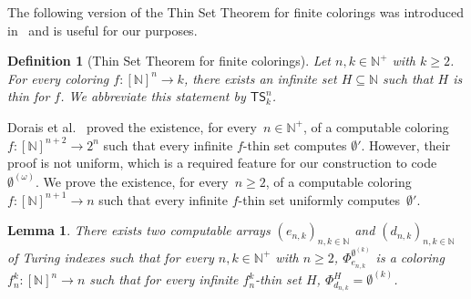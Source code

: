 \documentclass[10pt,a4paper]{article}
\newcommand{\TS}[0]{\mathsf{TS}}
\newcommand{\NN}[0]{\mathbb{N}}
\numberwithin{theorem}{section}
\newtheorem{lemma}[theorem]{Lemma}
\newtheorem{definition}[theorem]{Definition}
\begin{document}
The following version of the Thin Set Theorem for finite colorings was introduced in~\cite{dorais2016uniform} and is useful for our purposes.

\begin{definition}[Thin Set Theorem for finite colorings]\label{def:ts-finite}
Let $n, k\in \NN^+$ with $k\geq 2$. For every coloring $f : [\NN]^n \to k$, there exists an infinite set $H \subseteq \NN$ such that $H$ is thin for $f$. We abbreviate this statement by $\TS^n_{k}$.
\end{definition}

Dorais et al.~\cite[Proposition 5.5]{dorais2016uniform} proved the existence, for every~$n \in \NN^+$, of a computable coloring $f : [\NN]^{n+2} \to 2^n$ such that every infinite $f$-thin set computes $\emptyset'$. However, their proof is not uniform, which is a required feature for our construction to code $\emptyset^{(\omega)}$. We prove the existence, for every~$n \geq 2$, of a computable coloring $f : [\NN]^{n+1} \to n$ such that every infinite $f$-thin set uniformly computes~$\emptyset'$.


\begin{lemma}\label{lem:arrays}
    There exists two computable arrays $(e_{n,k})_{n,k \in \NN}$ and $(d_{n,k})_{n,k \in \NN}$ of Turing indexes such that for every $n, k \in \NN^+$ with $n \geq 2$, $\Phi_{e_{n,k}}^{\emptyset^{(k)}}$ is a coloring $f_n^k : [\NN]^{n} \to n$ such that for every infinite $f_n^k$-thin set $H$, $\Phi_{d_{n,k}}^{H} = \emptyset^{(k)}$.
\end{lemma}
\end{document}
